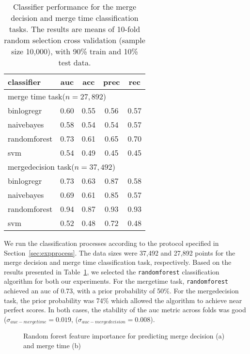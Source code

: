 \documentclass{sig-alternate}
\begin{document}
\begin{table}
  \centering
  \begin{tabular}{lcccc}
    \hline
    {\bf classifier} & {\sc auc} & {\sc acc} & {\sc prec} & {\sc rec} \\
    \hline
    \multicolumn{4}{l}{\textsf{merge time} task($n = 27,892$)} \\
    binlogregr    & 0.60 & 0.55 & 0.56 & 0.57  \\
    naivebayes    & 0.58 & 0.54 & 0.54 & 0.57  \\
    randomforest  & 0.73 & 0.61 & 0.65 & 0.70  \\
    svm           & 0.54 & 0.49 & 0.45 & 0.45  \\
    \hline
    \multicolumn{4}{l}{\textsf{mergedecision} task($n = 37,492$)} \\
    binlogregr    & 0.73 & 0.63 & 0.87 & 0.58  \\
    naivebayes    & 0.69 & 0.61 & 0.85 & 0.57  \\
    randomforest  & 0.94 & 0.87 & 0.93 & 0.93  \\
    svm           & 0.52 & 0.48 & 0.72 & 0.48  \\
    \hline
  \end{tabular}
  \caption{Classifier performance for the merge decision and merge time
  classification tasks. The results are means of 10-fold random selection
  cross validation (sample size 10,000), with 90\% train and 10\% test data.}
  \label{tab:classif-perf}
\end{table}

We run the classification processes according to the protocol specified in 
Section~\ref{sec:expprocess}. The data sizes
were 37,492 and 27,892 points for the merge decision and merge time
classification task, respectively.
Based on the results presented in Table~\ref{tab:classif-perf},
we selected the \texttt{randomforest} classification algorithm for
both our experiments. For the \textsf{mergetime} task, \texttt{randomforest}
achieved an {\sc auc} of 0.73, with a prior probability of 50\%. For 
the \textsf{mergedecision} task, the prior probability was 74\% which
allowed the algorithm to achieve near perfect scores. In both cases,
the stability of the {\sc auc} metric across folds was good 
($\sigma_{auc-mergetime} = 0.019$, ($\sigma_{auc-mergedecision} = 0.008$).

\begin{figure*}
\centering
{}
\caption{Random forest feature importance for predicting merge decision (a) and merge time (b)}
\label{fig:varimp}
\end{figure*}
\end{document}
